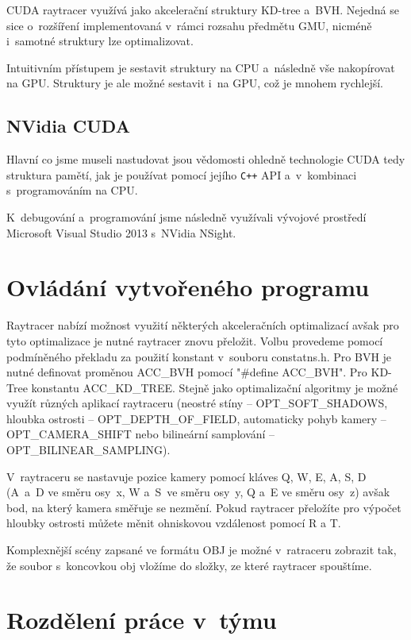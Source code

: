 \documentclass[12pt,a4paper,titlepage,final]{report}
\begin{document}
CUDA raytracer využívá jako akcelerační struktury KD-tree a~BVH. Nejedná se sice o~rozšíření implementovaná v~rámci rozsahu předmětu GMU, nicméně i~samotné struktury lze optimalizovat.

Intuitivním přístupem je sestavit struktury na CPU a~následně vše nakopírovat na GPU. Struktury je ale možné sestavit i~na GPU, což je mnohem rychlejší. \cite{karras}

\subsection{NVidia CUDA}
Hlavní co jsme museli nastudovat jsou vědomosti ohledně technologie CUDA tedy struktura pamětí, jak je používat pomocí jejího \verb!C++! API a~v~kombinaci s~programováním na CPU.

K~debugování a~programování jsme následně využívali vývojové prostředí Microsoft Visual Studio 2013 s~NVidia NSight.



\section{Ovládání vytvořeného programu}

Raytracer nabízí možnost využití některých akceleračních optimalizací avšak pro tyto optimalizace je nutné raytracer znovu přeložit. Volbu provedeme pomocí podmíněného překladu za použití konstant v~souboru constatns.h. Pro BVH je nutné definovat proměnou ACC\_BVH pomocí "\#define ACC\_BVH". Pro KD-Tree konstantu ACC\_KD\_TREE. Stejně jako optimalizační algoritmy je možné využít různých aplikací raytraceru (neostré  stíny -- OPT\_SOFT\_SHADOWS, hloubka ostrosti -- OPT\_DEPTH\_OF\_FIELD, automaticky pohyb kamery -- OPT\_CAMERA\_SHIFT nebo bilineární samplování -- OPT\_BILINEAR\_SAMPLING). 

V~raytraceru se nastavuje pozice kamery pomocí kláves Q, W, E, A, S, D (A~a~D ve směru osy~x, W a~S~ve směru osy~y, Q a~E ve směru osy~z) avšak bod, na který kamera směřuje se nezmění. Pokud raytracer přeložíte pro výpočet hloubky ostrosti můžete měnit ohniskovou vzdálenost pomocí R a T.

Komplexnější scény zapsané ve formátu OBJ je možné v~ratraceru zobrazit tak, že soubor s~koncovkou obj vložíme do složky, ze které raytracer spouštíme.  


\section{Rozdělení práce v~týmu}
\end{document}
